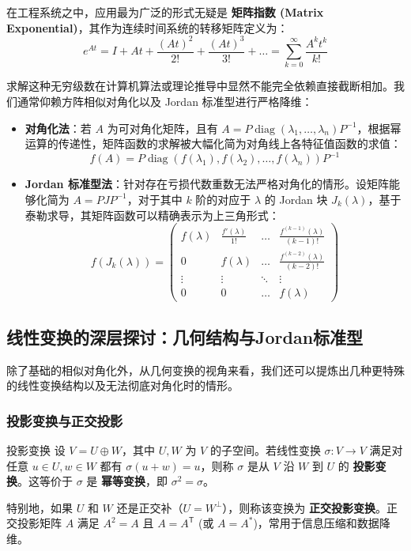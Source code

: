 \documentclass[a4paper,12pt]{ctexart}
\begin{document}
在工程系统之中，应用最为广泛的形式无疑是 \textbf{矩阵指数 (Matrix Exponential)}，其作为连续时间系统的转移矩阵定义为：
\[
e^{At} = I + At + \frac{(At)^2}{2!} + \frac{(At)^3}{3!} + \dots = \sum_{k=0}^\infty \frac{A^k t^k}{k!}
\]

求解这种无穷级数在计算机算法或理论推导中显然不能完全依赖直接截断相加。我们通常仰赖方阵相似对角化以及 Jordan 标准型进行严格降维：
\begin{itemize}
    \item \textbf{对角化法}：若 $A$ 为可对角化矩阵，且有 $A = P \operatorname{diag}(\lambda_1, \dots, \lambda_n) P^{-1}$，根据幂运算的传递性，矩阵函数的求解被大幅化简为对角线上各特征值函数的求值：
    \[ f(A) = P \operatorname{diag}(f(\lambda_1), f(\lambda_2), \dots, f(\lambda_n)) P^{-1} \]
    \item \textbf{Jordan 标准型法}：针对存在亏损代数重数无法严格对角化的情形。设矩阵能够化简为 $A = P J P^{-1}$，对于其中 $k$ 阶的对应于 $\lambda$ 的 Jordan 块 $J_k(\lambda)$，基于泰勒求导，其矩阵函数可以精确表示为上三角形式：
    \[
    f(J_k(\lambda)) = \begin{pmatrix} 
    f(\lambda) & \frac{f'(\lambda)}{1!} & \dots & \frac{f^{(k-1)}(\lambda)}{(k-1)!} \\ 
    0 & f(\lambda) & \dots & \frac{f^{(k-2)}(\lambda)}{(k-2)!} \\ 
    \vdots & \vdots & \ddots & \vdots \\ 
    0 & 0 & \dots & f(\lambda) 
    \end{pmatrix}
    \]
\end{itemize}

\subsection{线性变换的深层探讨：几何结构与Jordan标准型}

除了基础的相似对角化外，从几何变换的视角来看，我们还可以提炼出几种更特殊的线性变换结构以及无法彻底对角化时的情形。

\subsubsection{投影变换与正交投影}
\begin{mydef}{投影变换}{}
    设 $V = U \oplus W$，其中 $U, W$ 为 $V$ 的子空间。若线性变换 $\sigma: V \to V$ 满足对任意 $u \in U, w \in W$ 都有 $\sigma(u+w) = u$，则称 $\sigma$ 是从 $V$ 沿 $W$ 到 $U$ 的 \textbf{投影变换}。这等价于 $\sigma$ 是 \textbf{幂等变换}，即 $\sigma^2 = \sigma$。
    
    特别地，如果 $U$ 和 $W$ 还是正交补（$U = W^\perp$），则称该变换为 \textbf{正交投影变换}。正交投影矩阵 $A$ 满足 $A^2 = A$ 且 $A = A^{\mathsf{T}}$ (或 $A = A^*$)，常用于信息压缩和数据降维。
\end{mydef}
\end{document}
